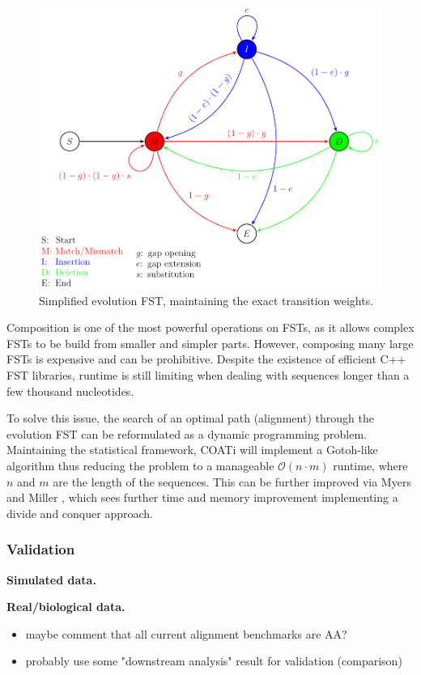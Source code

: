 \begin{figure}
    \vspace{-3em}
    \centering
    \includegraphics[scale=0.6]{figures/fig-dp-model.pdf}
    \caption{Simplified evolution FST, maintaining the exact transition weights.}
    \label{fig:dp-model}
\end{figure}

Composition is one of the most powerful operations on FSTs, as it allows complex
FSTs to be build from smaller and simpler parts.
However, composing many large FSTs is expensive and can be prohibitive.
Despite the existence of efficient C++ FST libraries, runtime is still limiting
when dealing with sequences longer than a few thousand nucleotides.

To solve this issue, the search of an optimal path (alignment) through the
evolution FST can be reformulated as a dynamic programming problem.
Maintaining the statistical framework, COATi will implement a Gotoh-like
algorithm thus reducing the problem to a manageable $\mathcal{O}(n \cdot m)$
runtime, where $n$ and $m$ are the length of the sequences.
This can be further improved via Myers and Miller , which sees
further time and memory improvement implementing a divide and conquer approach.


\subsubsection{Validation}
\textbf{Simulated data.}

\textbf{Real/biological data.}
\begin{itemize}
    \item maybe comment that all current alignment benchmarks are AA?
    \item probably use some "downstream analysis" result for validation (comparison)
\end{itemize}
